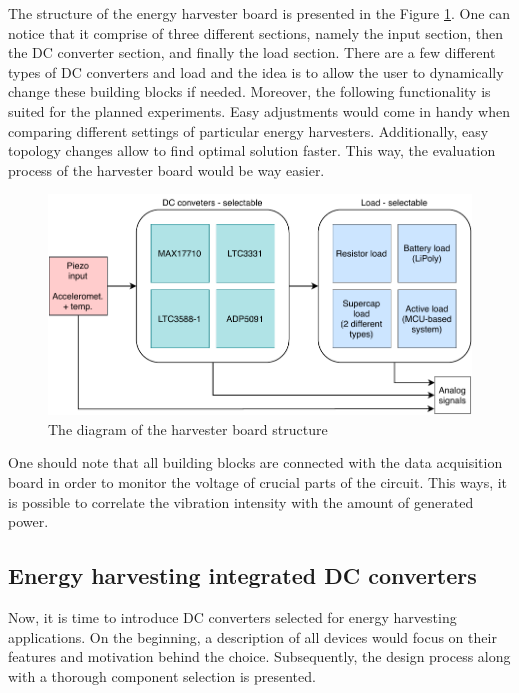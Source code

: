 \documentclass[12pt,a4paper]{article}
\begin{document}
The structure of the energy harvester board is presented in the Figure \ref{fig:harvesterdiagram}. One can notice that it comprise of three different sections, namely the input section, then the DC converter section, and finally the load section. There are a few different types of DC converters and load and the idea is to allow the user to dynamically change these building blocks if needed. Moreover, the following functionality is suited for the planned experiments. Easy adjustments would come in handy when comparing different settings of particular energy harvesters. Additionally, easy topology changes allow to find optimal solution faster. This way, the evaluation process of the harvester board would be way easier.\par

\begin{figure}[ht!]
\includegraphics[scale=0.9]{harvesterdiagram.pdf}
\caption{The diagram of the harvester board structure}
\label{fig:harvesterdiagram}
\end{figure}

One should note that all building blocks are connected with the data acquisition board in order to monitor the voltage of crucial parts of the circuit. This ways, it is possible to correlate the vibration intensity with the amount of generated power.


\subsection{Energy harvesting integrated DC converters}

Now, it is time to introduce DC converters selected for energy harvesting applications. On the beginning, a description of all devices would focus on their features and motivation behind the choice. Subsequently, the design process along with a thorough component selection is presented.
\end{document}
